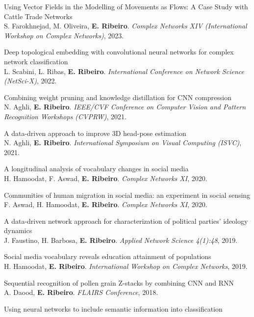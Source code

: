 \documentclass[11pt]{article}
\begin{document}
\begin{cvitems}
  \item Using Vector Fields in the Modelling of Movements as Flows: A Case Study with Cattle Trade Networks\\
  S. Farokhnejad, M. Oliveira, \textbf{E. Ribeiro}. \textit{Complex Networks XIV (International Workshop on Complex Networks)}, 2023.
  \item Deep topological embedding with convolutional neural networks for complex network classification\\
  L. Scabini, L. Ribas, \textbf{E. Ribeiro}. \textit{International Conference on Network Science (NetSci-X)}, 2022.
  \item Combining weight pruning and knowledge distillation for CNN compression\\
  N. Aghli, \textbf{E. Ribeiro}. \textit{IEEE/CVF Conference on Computer Vision and Pattern Recognition Workshops (CVPRW)}, 2021.
  \item A data-driven approach to improve 3D head-pose estimation\\
  N. Aghli, \textbf{E. Ribeiro}. \textit{International Symposium on Visual Computing (ISVC)}, 2021.
  \item A longitudinal analysis of vocabulary changes in social media\\
  H. Hamoodat, F. Aswad, \textbf{E. Ribeiro}. \textit{Complex Networks XI}, 2020.
  \item Communities of human migration in social media: an experiment in social sensing\\
  F. Aswad, H. Hamoodat, \textbf{E. Ribeiro}. \textit{Complex Networks XI}, 2020.
  \item A data-driven network approach for characterization of political parties' ideology dynamics\\
  J. Faustino, H. Barbosa, \textbf{E. Ribeiro}. \textit{Applied Network Science 4(1):48}, 2019.
  \item Social media vocabulary reveals education attainment of populations\\
  H. Hamoodat, \textbf{E. Ribeiro}. \textit{International Workshop on Complex Networks}, 2019.
  \item Sequential recognition of pollen grain Z-stacks by combining CNN and RNN\\
  A. Daood, \textbf{E. Ribeiro}. \textit{FLAIRS Conference}, 2018.
  \item Using neural networks to include semantic information into classification\\

\end{cvitems}
\end{document}
